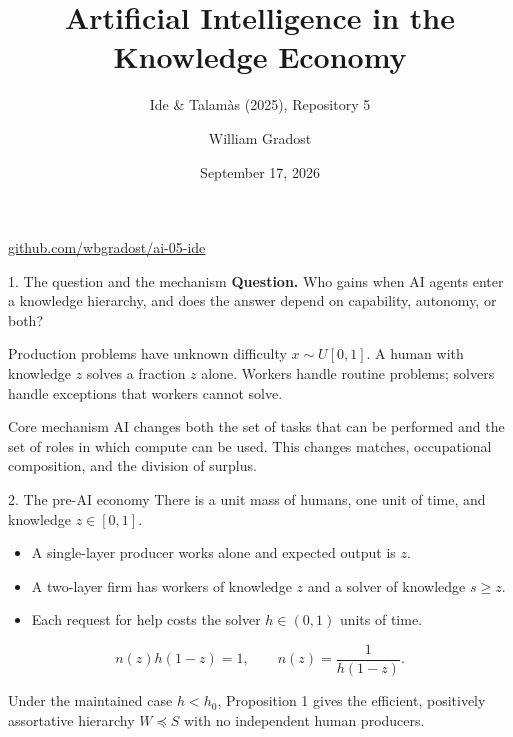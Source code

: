 \documentclass[aspectratio=169,11pt]{beamer}
\title{Artificial Intelligence in the Knowledge Economy}
\subtitle{Ide \& Talam\`as (2025), Repository 5}
\author{William Gradost}
\date{September 17, 2026}
\begin{document}
\begin{frame}[plain]\titlepage\begin{center}\small
\url{github.com/wbgradost/ai-05-ide}
\end{center}\end{frame}

\begin{frame}{1. The question and the mechanism}
\textbf{Question.} Who gains when AI agents enter a knowledge hierarchy, and
does the answer depend on capability, autonomy, or both?

\medskip
Production problems have unknown difficulty $x\sim U[0,1]$. A human with
knowledge $z$ solves a fraction $z$ alone. Workers handle routine problems;
solvers handle exceptions that workers cannot solve.

\medskip
\begin{block}{Core mechanism}
AI changes both the set of tasks that can be performed and the set of roles in
which compute can be used. This changes matches, occupational composition, and
the division of surplus.
\end{block}
\end{frame}

\begin{frame}{2. The pre-AI economy}
There is a unit mass of humans, one unit of time, and knowledge $z\in[0,1]$.

\begin{itemize}
\item A single-layer producer works alone and expected output is $z$.
\item A two-layer firm has workers of knowledge $z$ and a solver of knowledge
      $s\ge z$.
\item Each request for help costs the solver $h\in(0,1)$ units of time.
\end{itemize}

\[
n(z)h(1-z)=1,\qquad n(z)=\frac{1}{h(1-z)}.
\]

Under the maintained case $h<h_0$, Proposition 1 gives the efficient,
positively assortative hierarchy $W\preceq S$ with no independent human
producers.
\end{frame}
\end{document}
